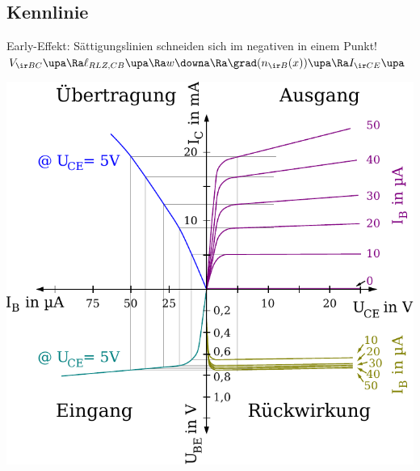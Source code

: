 \documentclass[fs, footer]{latex4ei}
\begin{document}
\begin{multicols*}{4}


\subsection{Kennlinie}
Early-Effekt: Sättigungslinien schneiden sich im negativen in einem Punkt!\\
$V_{\ir BC} \upa \Ra \ell_{RLZ,CB} \upa \Ra w \downa \Ra \grad(n_{\ir B}(x)) \upa \Ra I_{\ir CE} \upa$

\includegraphics[width = \columnwidth]{./img/bpt_kennlinie.pdf}


\end{multicols*}
\end{document}
